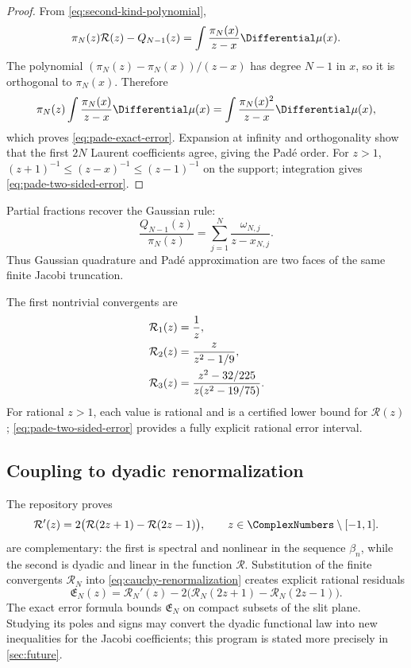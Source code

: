 \documentclass[11pt,oneside]{article}
\theoremstyle{definition}
\theoremstyle{remark}
\numberwithin{equation}{section}
\begin{document}
\begin{proof}
From \cref{eq:second-kind-polynomial},
\begin{equation*}
 \pi_N(z)\mathcal R(z)-Q_{N-1}(z)
 =\int\frac{\pi_N(x)}{z-x}\Differential\mu(x).
\end{equation*}
The polynomial
$(\pi_N(z)-\pi_N(x))/(z-x)$ has degree $N-1$ in $x$, so it is orthogonal to
$\pi_N(x)$.  Therefore
\begin{equation*}
 \pi_N(z)\int\frac{\pi_N(x)}{z-x}\Differential\mu(x)
 =\int\frac{\pi_N(x)^2}{z-x}\Differential\mu(x),
\end{equation*}
which proves \cref{eq:pade-exact-error}.  Expansion at infinity and
orthogonality show that the first $2N$ Laurent coefficients agree, giving the
Pad\'e order.  For $z>1$,
$(z+1)^{-1}\le(z-x)^{-1}\le(z-1)^{-1}$ on the support; integration gives
\cref{eq:pade-two-sided-error}.
\end{proof}

Partial fractions recover the Gaussian rule:
\begin{equation}
 \frac{Q_{N-1}(z)}{\pi_N(z)}
 =\sum_{j=1}^{N}\frac{\omega_{N,j}}{z-x_{N,j}}.
 \label{eq:pade-gauss-partial-fractions}
\end{equation}
Thus Gaussian quadrature and Pad\'e approximation are two faces of the same
finite Jacobi truncation.

The first nontrivial convergents are
\begin{align}
 \mathcal R_1(z)&=\frac1z,\notag\\
 \mathcal R_2(z)&=\frac{z}{z^2-1/9},\notag\\
 \mathcal R_3(z)&=\frac{z^2-32/225}{z(z^2-19/75)}.
 \label{eq:first-pade-convergents}
\end{align}
For rational $z>1$, each value is rational and is a certified lower bound for
$\mathcal R(z)$; \cref{eq:pade-two-sided-error} provides a fully explicit
rational error interval.

\subsection{Coupling to dyadic renormalization}
The repository proves
\begin{equation}
 \mathcal R'(z)=2\bigl(\mathcal R(2z+1)-\mathcal R(2z-1)\bigr),
 \qquad z\in\ComplexNumbers\setminus[-1,1].
 \label{eq:cauchy-renormalization}
\end{equation}
 are complementary:
the first is spectral and nonlinear in the sequence $\beta_n$, while the
second is dyadic and linear in the function $\mathcal R$.  Substitution of the
finite convergents $\mathcal R_N$ into \cref{eq:cauchy-renormalization} creates
explicit rational residuals
\begin{equation}
 \mathfrak E_N(z)=
 \mathcal R_N'(z)-2\bigl(\mathcal R_N(2z+1)-\mathcal R_N(2z-1)\bigr).
 \label{eq:pade-renormalization-residual}
\end{equation}
The exact error formula bounds $\mathfrak E_N$ on compact subsets of the slit
plane.  Studying its poles and signs may convert the dyadic functional law
into new inequalities for the Jacobi coefficients; this program is stated
more precisely in \cref{sec:future}.
\end{document}
